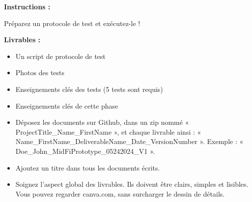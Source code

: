 \makeheaderfiles

\textbf{Instructions :}

Préparez un protocole de test et exécutez-le !

\textbf{Livrables :}

\begin{itemize}
\item Un script de protocole de test
\item Photos des tests
\item Enseignements clés des tests (5 tests sont requis)
\item Enseignements clés de cette phase
\item Déposez les documents sur Github, dans un zip nommé « ProjectTitle\_Name\_FirstName », et chaque livrable ainsi : « Name\_FirstName\_DeliverableName\_Date\_VersionNumber ». Exemple : « Doe\_John\_MidFiPrototype\_05242024\_V1 ».
\item Ajoutez un titre dans tous les documents écrits.
\item Soignez l'aspect global des livrables. Ils doivent être clairs, simples et lisibles. Vous pouvez regarder canva.com, sans surcharger le dessin de détails.
\end{itemize}

